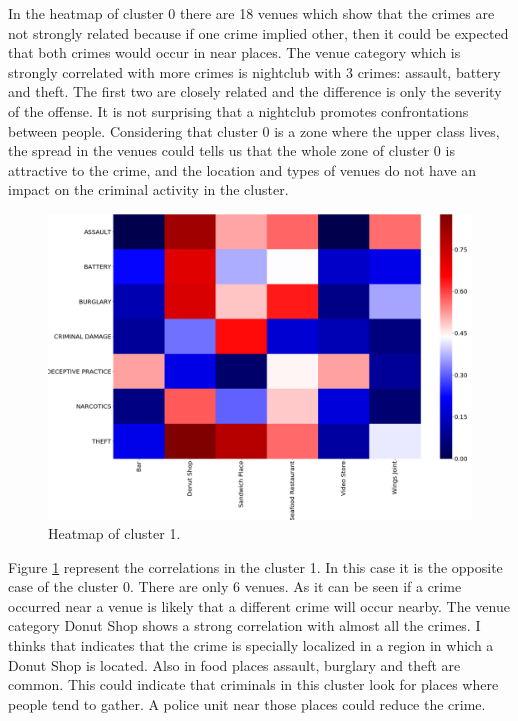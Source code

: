 \documentclass[a4paper,12pt]{article}
\begin{document}
In the heatmap of cluster 0 there are 18 venues which show that the crimes are not strongly related because if one crime implied other, then it could be expected that both crimes would occur in near places. The venue category which is strongly correlated with more crimes is nightclub with 3 crimes: assault, battery and theft. The first two are closely related and the difference is only the severity of the offense. It is not surprising that a nightclub promotes confrontations between people. Considering that cluster 0 is a zone where the upper class lives, the spread in the venues could tells us that the whole zone of cluster 0 is attractive to the crime, and the location and types of venues do not have an impact on the criminal activity in the cluster.
\begin{figure}[hb]
\centering 
\includegraphics[scale=0.65]{Heatmap_cluster_1} 
\caption{Heatmap of cluster 1. 
\label{fig:cluster_1}} 
\end{figure}

Figure \ref{fig:cluster_1} represent the correlations in the cluster 1. In this case it is the opposite case of the cluster 0. There are only 6 venues. As it can be seen if a crime occurred near a venue is likely that a different crime will occur nearby. The venue category Donut Shop shows a strong correlation with almost all the crimes. I thinks that indicates that the crime is specially localized in a region in which a Donut Shop is located. Also in food places assault, burglary and theft are common. This could indicate that criminals in this cluster look for places where people tend to gather. A police unit near those places could reduce the crime.
\end{document}
